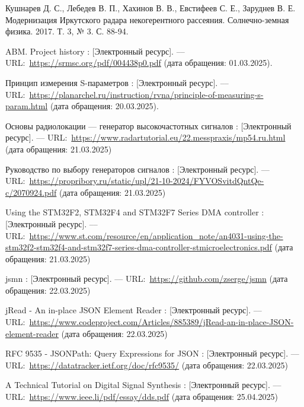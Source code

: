 \documentclass{report}
\begin{document}
\begin{thebibliography}{}

 Кушнарев Д. С., Лебедев В. П., Хахинов В. В., Евстифеев С. Е., Заруднев В. Е. Модернизация Иркутского радара некогерентного рассеяния. Солнечно-земная физика. 2017. Т. 3, № 3. С. 88-94.

 ABM. Project history : [Электронный ресурс]. --– URL:~\url{https://srmsc.org/pdf/004438p0.pdf} (дата обращения: 01.03.2025).

 Принцип измерения S-параметров : [Электронный ресурс]. --– URL:~\url{https://planarchel.ru/instruction/rvna/principle-of-measuring-s-param.html} (дата обращения: 20.03.2025).

 Основы радиолокации --- генератор высокочастотных сигналов : [Электронный ресурс]. --– URL:~\url{https://www.radartutorial.eu/22.messpraxis/mp54.ru.html} (дата обращения: 21.03.2025)

 Руководство по выбору генераторов сигналов : [Электронный ресурс]. --– URL:~\url{https://propribory.ru/static/upl/21-10-2024/FYVOSvitdQntQe-c/2070924.pdf} (дата обращения: 21.03.2025)

 Using the STM32F2, STM32F4 and STM32F7 Series DMA controller : [Электронный ресурс]. --– URL:~\url{https://www.st.com/resource/en/application_note/an4031-using-the-stm32f2-stm32f4-and-stm32f7-series-dma-controller-stmicroelectronics.pdf} (дата обращения: 21.03.2025)

 jsmn : [Электронный ресурс]. --– URL:~\url{https://github.com/zserge/jsmn} (дата обращения: 22.03.2025)

 jRead - An in-place JSON Element Reader : [Электронный ресурс]. --– URL:~\url{https://www.codeproject.com/Articles/885389/jRead-an-in-place-JSON-element-reader} (дата обращения: 22.03.2025)

 RFC 9535 - JSONPath: Query Expressions for JSON : [Электронный ресурс]. --– URL:~\url{https://datatracker.ietf.org/doc/rfc9535/} (дата обращения: 22.03.2025)

 A Technical Tutorial on Digital Signal Synthesis : [Электронный ресурс]. --– URL:~\url{https://www.ieee.li/pdf/essay/dds.pdf} (дата обращения: 25.04.2025)

\end{thebibliography}



\end{document}
